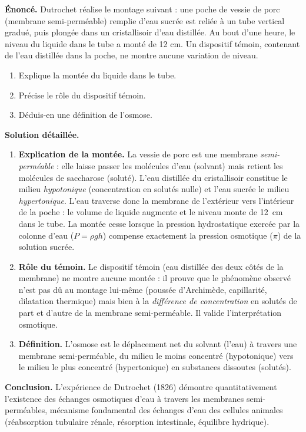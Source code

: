 \documentclass[11pt]{article}
\newcommand{\cle}[1]{{\popxbold\color{popdark}#1}}
\begin{document}
\begin{exoresolu}
\textbf{Énoncé.} Dutrochet réalise le montage suivant : une poche de vessie de porc (membrane semi-perméable) remplie d'eau sucrée est reliée à un tube vertical gradué, puis plongée dans un cristallisoir d'eau distillée. Au bout d'une heure, le niveau du liquide dans le tube a monté de 12 cm. Un dispositif témoin, contenant de l'eau distillée dans la poche, ne montre aucune variation de niveau.
\begin{enumerate}
\item Explique la montée du liquide dans le tube.
\item Précise le rôle du dispositif témoin.
\item Déduis-en une définition de l'osmose.
\end{enumerate}
\tcblower
\textbf{Solution détaillée.}
\begin{enumerate}
\item \textbf{Explication de la montée.} La vessie de porc est une membrane \emph{semi-perméable} : elle laisse passer les molécules d'eau (solvant) mais retient les molécules de saccharose (soluté). L'eau distillée du cristallisoir constitue le milieu \emph{hypotonique} (concentration en solutés nulle) et l'eau sucrée le milieu \emph{hypertonique}. L'eau traverse donc la membrane de l'extérieur vers l'intérieur de la poche : le volume de liquide augmente et le niveau monte de \SI{12}{cm} dans le tube. La montée cesse lorsque la pression hydrostatique exercée par la colonne d'eau ($P = \rho g h$) compense exactement la \cle{pression osmotique} ($\pi$) de la solution sucrée.
\item \textbf{Rôle du témoin.} Le dispositif témoin (eau distillée des deux côtés de la membrane) ne montre aucune montée : il prouve que le phénomène observé n'est pas dû au montage lui-même (poussée d'Archimède, capillarité, dilatation thermique) mais bien à la \emph{différence de concentration} en solutés de part et d'autre de la membrane semi-perméable. Il valide l'interprétation osmotique.
\item \textbf{Définition.} L'\cle{osmose} est le déplacement net du solvant (l'eau) à travers une membrane semi-perméable, du milieu le moins concentré (hypotonique) vers le milieu le plus concentré (hypertonique) en substances dissoutes (solutés).
\end{enumerate}
\textbf{Conclusion.} L'expérience de Dutrochet (1826) démontre quantitativement l'existence des échanges osmotiques d'eau à travers les membranes semi-perméables, mécanisme fondamental des échanges d'eau des cellules animales (réabsorption tubulaire rénale, résorption intestinale, équilibre hydrique).
\end{exoresolu}
\end{document}
